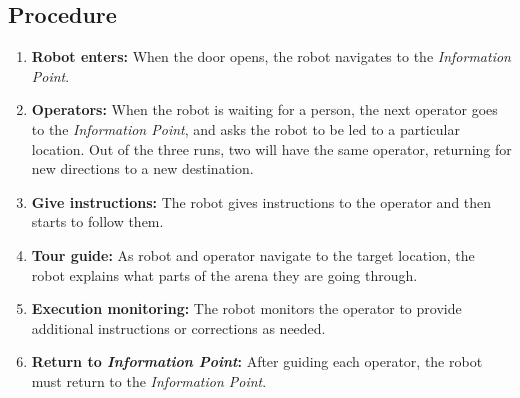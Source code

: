\subsection*{Procedure}
\begin{enumerate}[nosep]

	\item \textbf{Robot enters:} When the door opens, the robot navigates to the \emph{Information Point}.
	\item \textbf{Operators:} When the robot is waiting for a person, the next operator goes to the \emph{Information Point}, and asks the robot to be led to a particular location. Out of the three runs, two will have the same operator, returning for new directions to a new destination.
	\item \textbf{Give instructions:} The robot gives instructions to the operator and then starts to follow them.
	\item \textbf{Tour guide:} As robot and operator navigate to the target location, the robot explains what parts of the arena they are going through.
	\item \textbf{Execution monitoring:} The robot monitors the operator to provide additional instructions or corrections as needed.
	\item \textbf{Return to \emph{Information Point}:} After guiding each operator, the robot must return to the \emph{Information Point}.

\end{enumerate}

